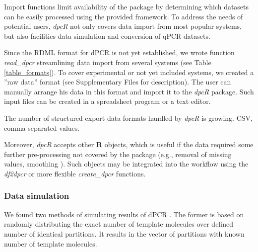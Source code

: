 \documentclass[a4,center,fleqn]{NAR}
\begin{document}
Import functions limit availability of the package by determining which datasets 
can be easily processed using the provided framework. To address the needs of 
potential users, \textit{dpcR} not only covers data import from most popular 
systems, but also facilities data simulation and conversion of qPCR datasets.

Since the RDML format for dPCR is not yet established, we wrote function 
\textit{read\_dpcr} streamlining data import from several systems (see Table 
\ref{table_formats}). To cover experimental or not yet included systems, we 
created a ''raw data'' format (see Supplementary Files for description). The 
user can manually arrange his data in this format and import it to the 
\textit{dpcR} package. Such input files can be created in a spreadsheet program 
or a text editor.

\begin{table}[b]
 {The number of structured export data formats handled by \textit{dpcR} is 
growing. CSV, comma separated values.}
\end{table}

Moreover, \textit{dpcR} accepts other \textbf{R} objects, which is useful if the 
data required some further pre-processing not covered by the package (e.g., 
removal of missing values, smoothing \cite{spiess_impact_2015}). Such objects 
may be integrated into the workflow using the \textit{df2dpcr} or more flexible 
\textit{create\_dpcr} functions.

\subsubsection{Data simulation}

We found two methods of simulating results of dPCR \cite{dube_mathematical_2008, 
jacobs_2014}. The former is based on randomly distributing the exact number 
of template molecules over defined number of identical partitions. It results in 
the vector of partitions with known number of template molecules. 
\end{document}

